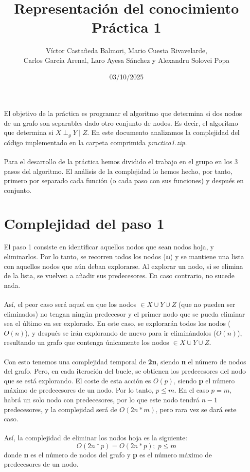 \documentclass[a4paper,12pt]{article}
\title{Representación del conocimiento \\ Práctica 1}
\author{Víctor Castañeda Balmori, Mario Cuesta Rivavelarde, \\
Carlos García Arenal, Laro Ayesa Sánchez y Alexandru Solovei Popa}
\date{03/10/2025}
\begin{document}
\maketitle
\thispagestyle{fancy}
El objetivo de la práctica es programar el algoritmo que determina si dos nodos de un grafo son separables dado otro conjunto de nodos. Es decir, el algoritmo que determina si $X \perp _g Y \mid Z$. En este documento analizamos la complejidad del código implementado en la carpeta comprimida \textit{practica1.zip}. \\ \\
Para el desarrollo de la práctica hemos dividido el trabajo en el grupo en los 3 pasos del algoritmo. El análisis de la complejidad lo hemos hecho, por tanto, primero por separado cada función (o cada paso con sus funciones) y después en conjunto.

\section{Complejidad del paso 1}

El paso 1 consiste en identificar aquellos nodos que sean nodos hoja, y eliminarlos. Por lo tanto, se recorren todos los nodos (\textbf{n}) y se mantiene una lista con aquellos nodos que aún deban explorarse. Al explorar un nodo, si se elimina de la lista, se vuelven a añadir sus predecesores. En caso contrario, no sucede nada. \\ \\
Así, el peor caso será aquel en que los nodos $\in X \cup Y \cup Z$ (que no pueden ser eliminados) no tengan ningún predecesor y el primer nodo que se pueda eliminar sea el último en ser explorado. En este caso, se explorarán todos los nodos ($O(n)$), y después se irán explorando de nuevo para ir eliminándolos ($O(n)$), resultando un grafo que contenga únicamente los nodos $\in X \cup Y \cup Z$. \\ \\
Con esto tenemos una complejidad temporal de \textbf{2n}, siendo \textbf{n} el número de nodos del grafo. Pero, en cada iteración del bucle, se obtienen los predecesores del nodo que se está explorando. El coste de esta acción es $O(p)$, siendo \textbf{p} el número máximo de predecesores de un nodo. Por lo tanto, $p \le m$. En el caso $p = m$, habrá un solo nodo con predecesores, por lo que este nodo tendrá $n - 1$ predecesores, y la complejidad será de $O(2n*m)$, pero rara vez se dará este caso. \\ \\
Así, la complejidad de eliminar los nodos hoja es la siguiente:
$$O(2n*p) = O(2n*p); \; p \le m$$
donde \textbf{n} es el número de nodos del grafo y \textbf{p} es el número máximo de predecesores de un nodo.
\end{document}
